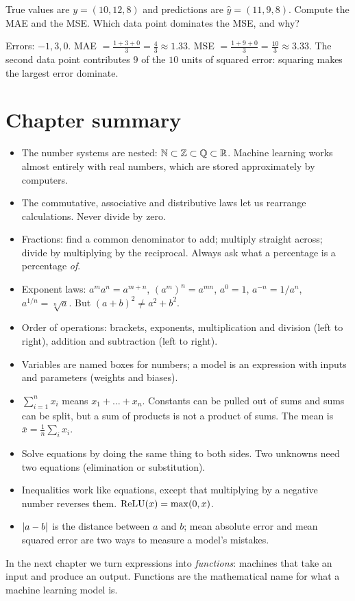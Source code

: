 \begin{exercise}
True values are $y = (10, 12, 8)$ and predictions are $\hat y = (11, 9, 8)$.
Compute the MAE and the MSE. Which data point dominates the MSE, and why?
\end{exercise}
\begin{solution}
Errors: $-1, 3, 0$. MAE $= \tfrac{1 + 3 + 0}{3} = \tfrac43 \approx 1.33$.
MSE $= \tfrac{1 + 9 + 0}{3} = \tfrac{10}{3} \approx 3.33$. The second data
point contributes $9$ of the $10$ units of squared error: squaring makes the
largest error dominate.
\end{solution}

\section{Chapter summary}\label{sec:ch1-summary}

\begin{keytakeaways}
\begin{itemize}
  \item The number systems are nested: $\mathbb{N} \subset \mathbb{Z} \subset \mathbb{Q} \subset \mathbb{R}$.
    Machine learning works almost entirely with real numbers, which are
    stored approximately by computers.
  \item The commutative, associative and distributive laws let us rearrange
    calculations. Never divide by zero.
  \item Fractions: find a common denominator to add; multiply straight across;
    divide by multiplying by the reciprocal. Always ask what a percentage is a
    percentage \emph{of}.
  \item Exponent laws: $a^m a^n = a^{m+n}$, $(a^m)^n = a^{mn}$, $a^0 = 1$,
    $a^{-n} = 1/a^n$, $a^{1/n} = \sqrt[n]{a}$. But $(a+b)^2 \neq a^2 + b^2$.
  \item Order of operations: brackets, exponents, multiplication and division
    (left to right), addition and subtraction (left to right).
  \item Variables are named boxes for numbers; a model is an expression with
    inputs and parameters (weights and biases).
  \item $\sum_{i=1}^n x_i$ means $x_1 + \dots + x_n$. Constants can be pulled
    out of sums and sums can be split, but a sum of products is not a product
    of sums. The mean is $\bar x = \frac1n\sum_i x_i$.
  \item Solve equations by doing the same thing to both sides. Two unknowns
    need two equations (elimination or substitution).
  \item Inequalities work like equations, except that multiplying by a
    negative number reverses them. $\operatorname{ReLU}(x) = \max(0, x)$.
  \item $\lvert a - b\rvert$ is the distance between $a$ and $b$; mean absolute error
    and mean squared error are two ways to measure a model's mistakes.
\end{itemize}
\end{keytakeaways}

In the next chapter we turn expressions into \emph{functions}: machines that
take an input and produce an output. Functions are the mathematical name for
what a machine learning model is.
